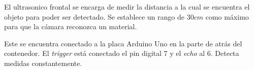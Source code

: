 El ultrasonico frontal se encarga de medir la distancia a la cual se encuentra el objeto para poder ser detectado. Se establece un rango de $30 cm$ como máximo para que la cámara reconozca un material.

Este se encuentra conectado a la placa Arduino Uno en la parte de atrás del contenedor. El \emph{trigger} está conectado el pin digital 7 y el \emph{echo} al 6. Detecta medidas constantemente.